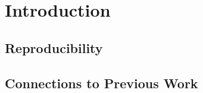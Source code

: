 \chapter{Introduction}\label{ch:Introduction}


\section{Reproducibility}\label{sec:reproducibility}


\section{Connections to Previous Work}\label{sec:previouswork}

